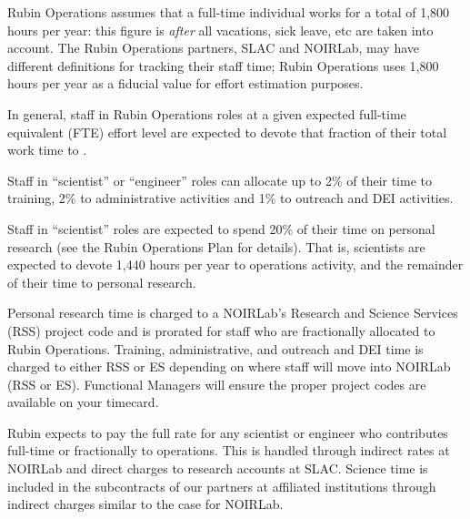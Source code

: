 Rubin \gls{Operations} assumes that a full-time individual works for a total of 1,800 hours per year: this figure is \emph{after} all vacations, sick leave, etc are taken into account.
The \gls{Rubin Operations} partners, \gls{SLAC} and \gls{NOIRLab}, may have different definitions for tracking their staff time; \gls{Rubin Operations} uses 1,800 hours per year as a fiducial value for effort estimation purposes.

In general, staff in \gls{Rubin Operations} roles at a given expected full-time equivalent (\gls{FTE}) effort level are expected to devote that fraction of their total work time to \RO.

Staff in ``scientist'' or ``engineer'' roles can allocate up to 2\% of their time to training, 2\% to administrative activities and 1\% to outreach and \gls{DEI} activities.

Staff in ``scientist'' roles are expected to spend 20\% of their time on personal research (see the \gls{Rubin Operations} Plan for details).
That is, scientists are expected to devote 1,440 hours per
year to operations activity, and the remainder of their time to personal research.

Personal research time is charged to a \gls{NOIRLab}'s Research and Science Services (\gls{RSS}) project code and is prorated for staff who are fractionally allocated to \gls{Rubin Operations}.
Training, administrative, and outreach and \gls{DEI} time is charged to either RSS or \gls{ES} depending on where staff will move into \gls{NOIRLab} (RSS or \gls{ES}).
Functional Managers will ensure the proper project codes are available on your timecard.

Rubin expects to pay the full rate for any scientist or engineer who contributes full-time or fractionally to operations.
This is handled through indirect rates at \gls{NOIRLab} and direct charges to research accounts at \gls{SLAC}.
Science time is included in the subcontracts of our partners at affiliated institutions through indirect charges
similar to the case for \gls{NOIRLab}.


